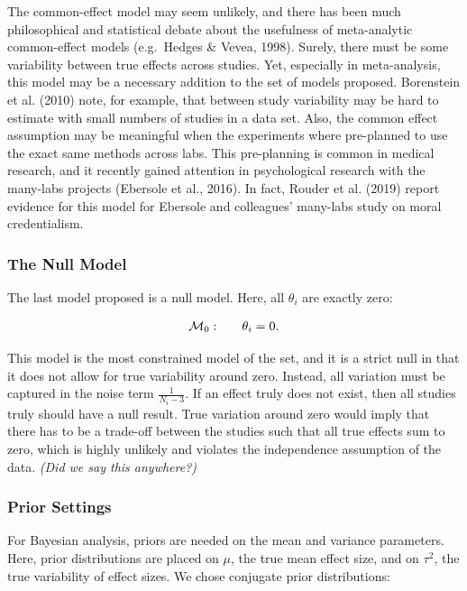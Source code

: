\documentclass[english,,man]{apa6}
\begin{document}
The common-effect model may seem unlikely, and there has been much philosophical and statistical debate about the usefulness of meta-analytic common-effect models (e.g.~Hedges \& Vevea, 1998). Surely, there must be some variability between true effects across studies. Yet, especially in meta-analysis, this model may be a necessary addition to the set of models proposed. Borenstein et al. (2010) note, for example, that between study variability may be hard to estimate with small numbers of studies in a data set. Also, the common effect assumption may be meaningful when the experiments where pre-planned to use the exact same methods across labs. This pre-planning is common in medical research, and it recently gained attention in psychological research with the many-labs projects (Ebersole et al., 2016). In fact, Rouder et al. (2019) report evidence for this model for Ebersole and colleagues' many-labs study on moral credentialism.

\hypertarget{the-null-model}{%
\subsubsection{The Null Model}\label{the-null-model}}

The last model proposed is a null model. Here, all \(\theta_i\) are exactly zero:

\[
  \begin{array}{llr}
{\cal M}_0: && \theta_i = 0.\\
\end{array}
\]

This model is the most constrained model of the set, and it is a strict null in that it does not allow for true variability around zero. Instead, all variation must be captured in the noise term \(\frac{1}{N_i - 3}\). If an effect truly does not exist, then all studies truly should have a null result. True variation around zero would imply that there has to be a trade-off between the studies such that all true effects sum to zero, which is highly unlikely and violates the independence assumption of the data. \emph{ (Did we say this anywhere?)}

\hypertarget{prior-settings}{%
\subsubsection{Prior Settings}\label{prior-settings}}

For Bayesian analysis, priors are needed on the mean and variance parameters. Here, prior distributions are placed on \(\mu\), the true mean effect size, and on \(\tau^2\), the true variability of effect sizes. We chose conjugate prior distributions:
\end{document}
